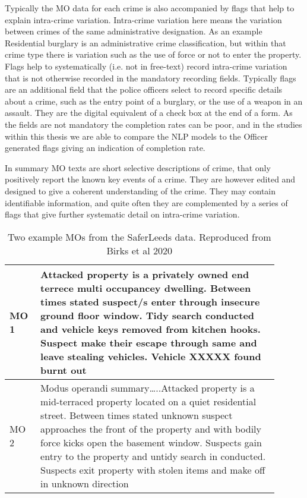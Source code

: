 Typically the MO data for each crime is also accompanied by flags that help to explain intra-crime variation. Intra-crime variation here means the variation between crimes of the same administrative designation. As an example Residential burglary is an administrative crime classification, but within that crime type there is variation such as the use of force or not to enter the property. Flags help to systematically (i.e. not in free-text) record intra-crime variation that is not otherwise recorded in the mandatory recording fields. Typically flags are an additional field that the police officers select to record specific details about a crime, such as the entry point of a burglary, or the use of a weapon in an assault. They are the digital equivalent of a check box at the end of a form. As the fields are not mandatory the completion rates can be poor, and in the studies within this thesis we are able to compare the NLP models to the Officer generated flags giving an indication of completion rate.

In summary MO texts are short selective descriptions of crime, that only positively report the known key events of a crime. They are however edited and designed to give a coherent understanding of the crime. They may contain identifiable information, and quite often they are complemented by a series of flags that give further systematic detail on intra-crime variation.

\begin{table}[]
\centering
\begin{tabular}{p{0.1\linewidth}p{0.8\linewidth}}

\toprule
MO 1 & Attacked property is a privately owned end terrece multi occupancey dwelling. Between times stated suspect/s enter through insecure ground floor window. Tidy search conducted and vehicle keys removed from kitchen hooks. Suspect make their escape through same and leave stealing vehicles. Vehicle XXXXX found burnt out                                                               \\ \midrule
MO 2 & Modus operandi summary…..Attacked property is a mid-terraced property located on a quiet residential street. Between times stated unknown suspect approaches the front of the property and with bodily force kicks open the basement window. Suspects gain entry to the property and untidy search in conducted. Suspects exit property with stolen items and make off in unknown direction \\ \bottomrule
\end{tabular}
\caption{\label{tab:example_mo} Two example MOs from the SaferLeeds data. Reproduced from Birks et al 2020}
\end{table}


